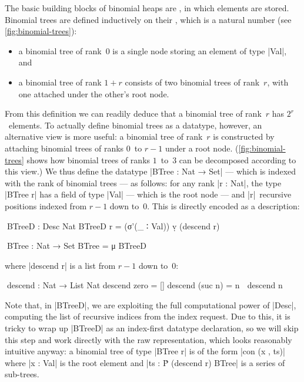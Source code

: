 The basic building blocks of binomial heaps are , in which elements are stored.
Binomial trees are defined inductively on their , which is a natural number (see \autoref{fig:binomial-trees}):
\begin{itemize}
\item a binomial tree of rank~$0$ is a single node storing an element of type |Val|, and
\item a binomial tree of rank $1+r$ consists of two binomial trees of rank~$r$, with one attached under the other's root node.
\end{itemize}
From this definition we can readily deduce that a binomial tree of rank~$r$ has $2^r$~elements.
To actually define binomial trees as a datatype, however, an alternative view is more useful: a binomial tree of rank~$r$ is constructed by attaching binomial trees of ranks $0$~to $r-1$ under a root node.
(\autoref{fig:binomial-trees} shows how binomial trees of ranks $1$~to~$3$ can be decomposed according to this view.)
We thus define the datatype |BTree : Nat → Set| --- which is indexed with the rank of binomial trees --- as follows: for any rank |r : Nat|, the type |BTree r| has a field of type |Val| --- which is the root node --- and |r|~recursive positions indexed from $r-1$ down to~$0$.
This is directly encoded as a description:
\begin{code}
^^^BTreeD : Desc Nat
BTreeD r = (σ'(_ ∶ Val)) ṿ (descend r)

^^^BTree : Nat → Set
BTree = μ BTreeD
\end{code}
where |descend r| is a list from $r-1$ down to~$0$:
\begin{code}
^^^descend : Nat → List Nat
descend zero     =  []
descend (suc n)  =  n ∷ descend n
\end{code}
Note that, in |BTreeD|, we are exploiting the full computational power of |Desc|, computing the list of recursive indices from the index request.
Due to this, it is tricky to wrap up |BTreeD| as an index-first datatype declaration, so we will skip this step and work directly with the raw representation, which looks reasonably intuitive anyway: a binomial tree of type |BTree r| is of the form |con (x , ts)| where |x : Val| is the root element and |ts : Ṗ (descend r) BTree| is a series of sub-trees.

